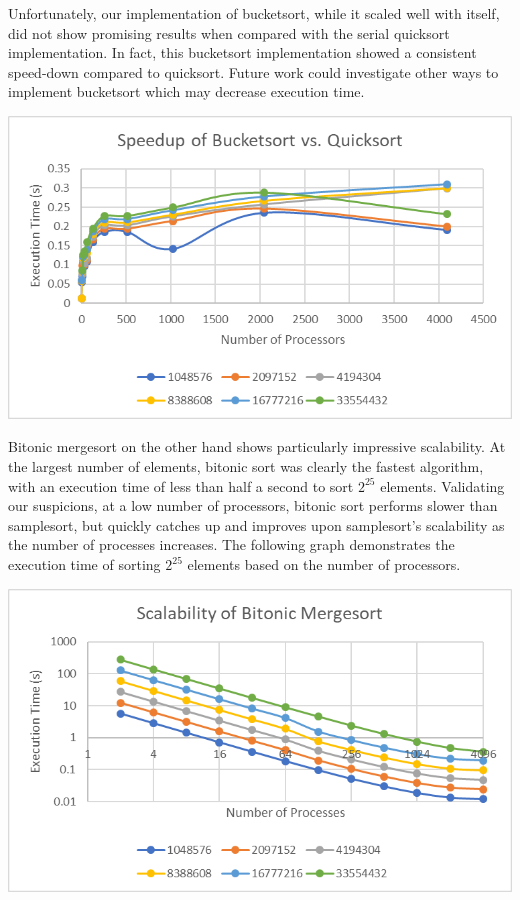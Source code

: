 \documentclass[10pt,letterpaper]{article}
\begin{document}
\begin{multicols}{2}
Unfortunately, our implementation of bucketsort, while it scaled well with itself, did not show promising results when compared with the serial quicksort implementation. In fact, this bucketsort implementation showed a consistent speed-down compared to quicksort. Future work could investigate other ways to implement bucketsort which may decrease execution time.

\begin{center}
\includegraphics[scale=1.3]{bucket_speedup}
\end{center}

Bitonic mergesort on the other hand shows particularly impressive scalability. At the largest number of elements, bitonic sort was clearly the fastest algorithm, with an execution time of less than half a second to sort $2^{25}$ elements. Validating our suspicions, at a low number of processors, bitonic sort performs slower than samplesort, but quickly catches up and improves upon samplesort's scalability as the number of processes increases. The following graph demonstrates the execution time of sorting $2^{25}$ elements based on the number of processors.

\begin{center}
\includegraphics[scale=1.3]{bitonic_scale}
\end{center}


\end{multicols}
\end{document}
